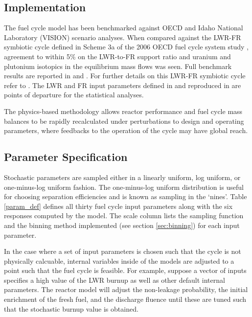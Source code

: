 \documentclass[a4paper, 12pt]{article}
\begin{document}
\subsection{Implementation}
\label{sec:implementation}

The fuel cycle model has been benchmarked against OECD and Idaho National Laboratory
(VISION) scenario analyses. When compared against the LWR-FR symbiotic cycle defined in Scheme
3a of the 2006 OECD fuel cycle system study \cite{NEA-5990}, agreement to within 5\% on the LWR-to-FR support
ratio and uranium and plutonium isotopics in the equilibrium mass flows was seen. Full benchmark
results are reported in \cite{Scopatz2009} and \cite{Li2009}.  For further details on this LWR-FR
symbiotic cycle refer to \cite{Shropshire2009}. The LWR and FR input parameters defined in
\cite{Shropshire2009} and reproduced in \cite{Scopatz2009} are points of departure for the
statistical analyses.

The physics-based methodology allows reactor performance and fuel cycle mass
balances to be rapidly recalculated under perturbations to design and operating parameters, where feedbacks to the operation of the cycle may have global reach.

\subsection{Parameter Specification}
\label{sec:paramspec}

Stochastic parameters are sampled either in a linearly uniform, log uniform, or one-minus-log uniform fashion.
The one-minus-log uniform distribution is useful for choosing separation efficiencies and is known as sampling
in the `nines'.  Table \ref{param_def} defines all thirty fuel cycle input parameters along with the six
responses computed by the model.  The scale column lists the sampling function
and the binning method implemented (see section \ref{sec:binning}) for each input parameter.

In the case where a set of input parameters is chosen such that the cycle is not physically calcuable,
internal variables inside of the models are adjusted to a point such that the fuel cycle is feasible.
For example, suppose a vector of inputs specifies a high value of the LWR burnup as well as other default
internal parameters.  The reactor model will adjust the non-leakage probability, the initial enrichment
of the fresh fuel, and the discharge fluence until these are tuned such that the stochastic burnup value
is obtained.
\end{document}

